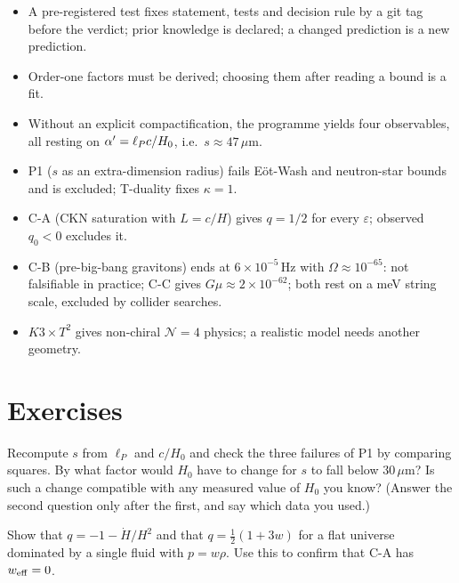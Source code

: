\begin{summarybox}
\begin{itemize}[leftmargin=*,itemsep=1pt]
\item A pre-registered test fixes statement, tests and decision rule by a git tag before the
 verdict; prior knowledge is declared; a changed prediction is a new prediction.
\item Order-one factors must be derived; choosing them after reading a bound is a fit.
\item Without an explicit compactification, the programme yields four observables, all resting on
 $\alpha'=\ell_P c/H_0$, i.e.\ $s\approx47\,\mu$m.
\item P1 ($s$ as an extra-dimension radius) fails Eöt-Wash and neutron-star bounds and is
 excluded; T-duality fixes $\kappa=1$.
\item C-A (CKN saturation with $L=c/H$) gives $q=1/2$ for every $\varepsilon$; observed $q_0<0$
 excludes it.
\item C-B (pre-big-bang gravitons) ends at $6\times10^{-5}$\,Hz with $\Omega\approx10^{-65}$: not
 falsifiable in practice; C-C gives $G\mu\approx2\times10^{-62}$; both rest on a meV string scale,
 excluded by collider searches.
\item $K3\times T^2$ gives non-chiral $\mathcal N=4$ physics; a realistic model needs another
 geometry.
\end{itemize}
\end{summarybox}

\section*{Exercises}

\begin{exercise}[$\star$]
Recompute $s$ from $\ell_P$ and $c/H_0$ and check the three failures of P1 by comparing squares.
By what factor would $H_0$ have to change for $s$ to fall below $30\,\mu$m? Is such a change
compatible with any measured value of $H_0$ you know? (Answer the second question only after the
first, and say which data you used.)
\end{exercise}

\begin{exercise}[$\star$]
Show that $q=-1-\dot H/H^2$ and that $q=\tfrac12(1+3w)$ for a flat universe dominated by a single
fluid with $p=w\rho$. Use this to confirm that C-A has $w_{\rm eff}=0$.
\end{exercise}

